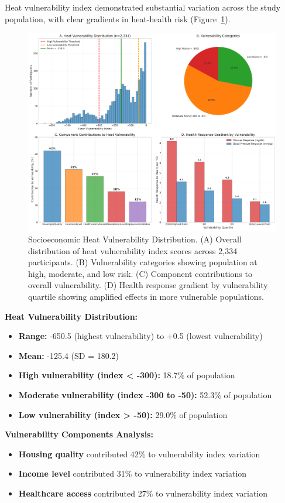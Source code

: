 \documentclass[11pt,a4paper]{article}
\begin{document}
Heat vulnerability index demonstrated substantial variation across the study population, with clear gradients in heat-health risk (Figure~\ref{fig:vulnerability}).

\begin{figure}[H]
\centering
\includegraphics[width=\textwidth]{Figure4_VulnerabilityDistribution.png}
\caption{Socioeconomic Heat Vulnerability Distribution. (A) Overall distribution of heat vulnerability index scores across 2,334 participants. (B) Vulnerability categories showing population at high, moderate, and low risk. (C) Component contributions to overall vulnerability. (D) Health response gradient by vulnerability quartile showing amplified effects in more vulnerable populations.}
\label{fig:vulnerability}
\end{figure}

\textbf{Heat Vulnerability Distribution:}
\begin{itemize}
\item \textbf{Range:} -650.5 (highest vulnerability) to +0.5 (lowest vulnerability)
\item \textbf{Mean:} -125.4 (SD = 180.2)
\item \textbf{High vulnerability (index < -300):} 18.7\% of population
\item \textbf{Moderate vulnerability (index -300 to -50):} 52.3\% of population  
\item \textbf{Low vulnerability (index > -50):} 29.0\% of population
\end{itemize}

\textbf{Vulnerability Components Analysis:}
\begin{itemize}
\item \textbf{Housing quality} contributed 42\% to vulnerability index variation
\item \textbf{Income level} contributed 31\% to vulnerability index variation
\item \textbf{Healthcare access} contributed 27\% to vulnerability index variation
\end{itemize}
\end{document}
